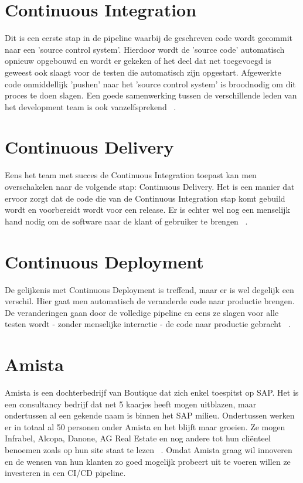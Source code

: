\section{Continuous Integration}
\label{sec:continuous-integration}
    Dit is een eerste stap in de pipeline waarbij de geschreven code wordt gecommit naar een 'source control system'. Hierdoor wordt de 'source code' automatisch opnieuw opgebouwd en wordt er gekeken of het deel dat net toegevoegd is geweest ook slaagt voor de testen die automatisch zijn opgestart. Afgewerkte code onmiddellijk 'pushen' naar het 'source control system' is broodnodig om dit proces te doen slagen. Een goede samenwerking tussen de verschillende leden van het development team is ook vanzelfsprekend ~\autocite{Riti2018}. 

\section{Continuous Delivery}
\label{sec:continuous-delivery}
    Eens het team met succes de Continuous Integration toepast kan men overschakelen naar de volgende stap: Continuous Delivery.
    Het is een manier dat ervoor zorgt dat de code die van de Continuous Integration stap komt gebuild wordt en voorbereidt wordt voor een release.
    Er is echter wel nog een menselijk hand nodig om de software naar de klant of gebruiker te brengen ~\autocite{Fowler2013}. 

\section{Continuous Deployment}
\label{sec:continuous-deployment}
    De gelijkenis met Continuous Deployment is treffend, maar er is wel degelijk een verschil.
    Hier gaat men automatisch de veranderde code naar productie brengen. De veranderingen gaan door de volledige pipeline en eens ze slagen voor alle testen wordt - zonder menselijke interactie - de code naar productie gebracht ~\autocite{Claps2015}.

\section{Amista}
\label{sec:amista}
    Amista is een dochterbedrijf van Boutique dat zich enkel toespitst op SAP. Het is een consultancy bedrijf dat net 5 kaarjes heeft mogen uitblazen, maar ondertussen al een gekende naam is binnen het SAP milieu. Ondertussen werken er in totaal al 50 personen onder Amista en het blijft maar groeien. Ze mogen Infrabel, Alcopa, Danone, AG Real Estate en nog andere tot hun cliënteel benoemen zoals op hun site staat te lezen ~\autocite{Amista2018}.
    Omdat Amista graag wil innoveren en de wensen van hun klanten zo goed mogelijk probeert uit te voeren willen ze investeren in een CI/CD pipeline.

